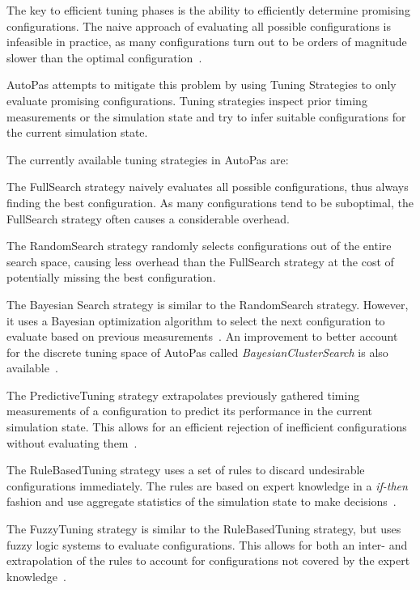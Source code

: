 \documentclass[conference]{IEEEtran}
\begin{document}
The key to efficient tuning phases is the ability to efficiently determine promising configurations. The naive approach of evaluating all possible configurations is infeasible in practice, as many configurations turn out to be orders of magnitude slower than the optimal configuration~\cite{endreport.pdf}\cite{Manuel_Lerchner_Thesis.pdf}.

AutoPas attempts to mitigate this problem by using Tuning Strategies to only evaluate promising configurations. Tuning strategies inspect prior timing measurements or the simulation state and try
to infer suitable configurations for the current simulation state.

The currently available tuning strategies in AutoPas are:

\begin{description}[style=nextline]
    \item[FullSearch]
        The FullSearch strategy naively evaluates all possible configurations, thus always finding the best configuration. As many configurations tend to be suboptimal\cite{Manuel_Lerchner_Thesis.pdf}, the FullSearch strategy often causes a considerable overhead.

    \item[RandomSearch]
        The RandomSearch strategy randomly selects configurations out of the entire search space, causing less overhead than the FullSearch strategy at the cost of potentially missing the best configuration.

    \item[BayesianSearch]
        The Bayesian Search strategy is similar to the RandomSearch strategy. However, it uses a Bayesian optimization algorithm to select the next configuration to evaluate based on previous measurements~\cite{njan_master}. An improvement to better account for the discrete tuning space of AutoPas called \textit{BayesianClusterSearch} is also available~\cite{njan_master}.

    \item[PredictiveTuning]
        The PredictiveTuning strategy extrapolates previously gathered timing measurements of a configuration to predict its performance in the current simulation state. This allows for an efficient rejection of inefficient configurations without evaluating them~\cite{pelloth2020}.

    \item[RuleBasedTuning]
        The RuleBasedTuning strategy uses a set of rules to discard undesirable configurations immediately. The rules are based on expert knowledge in a \textit{if-then} fashion and use aggregate statistics of the simulation state to make decisions~\cite{endreport.pdf}.

    \item[FuzzyTuning]
        The FuzzyTuning strategy is similar to the RuleBasedTuning strategy, but uses fuzzy logic systems to evaluate configurations. This allows for both an inter- and extrapolation of the rules to account for configurations not covered by the expert knowledge~\cite{Manuel_Lerchner_Thesis.pdf}.

\end{description}
\end{document}
